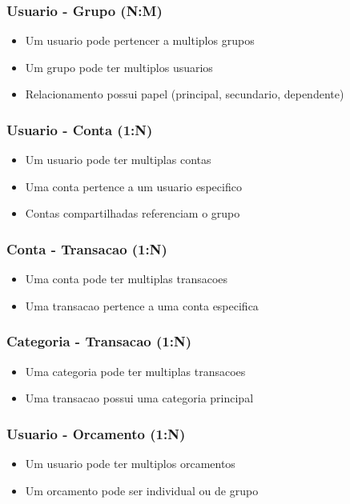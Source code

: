 \subsubsection{Usuario - Grupo (N:M)}
\begin{itemize}
    \item Um usuario pode pertencer a multiplos grupos
    \item Um grupo pode ter multiplos usuarios
    \item Relacionamento possui papel (principal, secundario, dependente)
\end{itemize}

\subsubsection{Usuario - Conta (1:N)}
\begin{itemize}
    \item Um usuario pode ter multiplas contas
    \item Uma conta pertence a um usuario especifico
    \item Contas compartilhadas referenciam o grupo
\end{itemize}

\subsubsection{Conta - Transacao (1:N)}
\begin{itemize}
    \item Uma conta pode ter multiplas transacoes
    \item Uma transacao pertence a uma conta especifica
\end{itemize}

\subsubsection{Categoria - Transacao (1:N)}
\begin{itemize}
    \item Uma categoria pode ter multiplas transacoes
    \item Uma transacao possui uma categoria principal
\end{itemize}

\subsubsection{Usuario - Orcamento (1:N)}
\begin{itemize}
    \item Um usuario pode ter multiplos orcamentos
    \item Um orcamento pode ser individual ou de grupo
\end{itemize}

